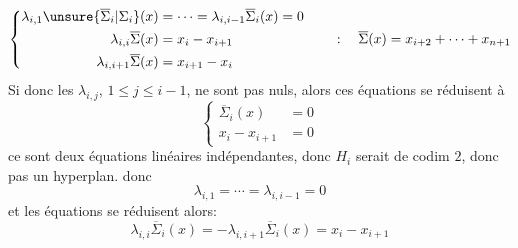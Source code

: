 \[
\left\{\begin{aligned}
\lambda_{i,1}\unsure{\overline{\Sigma}_i|\Sigma_i}(x)&=\cdots=\lambda_{i,i-1}\overline{\Sigma}_i(x)=0\\
\lambda_{i,i}\overline{\Sigma}(x)&=x_i-x_{i+1}\\
\lambda_{i,i+1}\overline{\Sigma}(x)&=x_{i+1}-x_i
\end{aligned}\right.
\qquad :\quad\overline{\Sigma}(x)=x_{i+2}+\cdots+x_{n+1}
\]
Si donc les $\lambda_{i,j}$, $1\leq j\leq i-1$, ne sont pas nuls, alors ces équations se réduisent à
\[
\left\{\begin{aligned}
\overline{\Sigma}_i(x)&=0\\
x_i-x_{i+1}&=0
\end{aligned}\right.
\]
ce sont deux équations linéaires indépendantes, donc $H_i$ serait de codim $2$, donc pas un hyperplan.  donc
\[
\lambda_{i,1}=\cdots=\lambda_{i,i-1}=0
\]
et les équations se  réduisent alors:
\[
\lambda_{i,i}\overline{\Sigma}_i(x)=-\lambda_{i,i+1}\overline{\Sigma}_i(x)=x_i-x_{i+1}
\]
 

